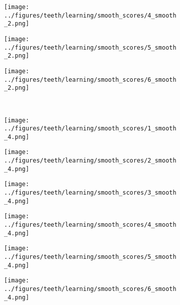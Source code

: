\begin{figure}[h!]
\begin{subfigure}{0.16\textwidth}
	\end{subfigure}
	\begin{subfigure}{0.16\textwidth}
		\centering
		\texttt{[image: ../figures/teeth/learning/smooth\_scores/4\_smooth\_2.png]}
		\label{fig:1}
	\end{subfigure}
	\begin{subfigure}{0.16\textwidth}
		\centering
		\texttt{[image: ../figures/teeth/learning/smooth\_scores/5\_smooth\_2.png]}
		\label{fig:1}
	\end{subfigure}
	\begin{subfigure}{0.16\textwidth}
		\centering
		\texttt{[image: ../figures/teeth/learning/smooth\_scores/6\_smooth\_2.png]}
		\label{fig:1}
	\end{subfigure}
	\vspace{-0.35cm}
	\\
	\begin{subfigure}{0.16\textwidth}
		\centering
		\texttt{[image: ../figures/teeth/learning/smooth\_scores/1\_smooth\_4.png]}
		\label{fig:1}
	\end{subfigure}
	\begin{subfigure}{0.16\textwidth}
		\centering
		\texttt{[image: ../figures/teeth/learning/smooth\_scores/2\_smooth\_4.png]}
		\label{fig:1}
	\end{subfigure}
	\begin{subfigure}{0.16\textwidth}
		\centering
		\texttt{[image: ../figures/teeth/learning/smooth\_scores/3\_smooth\_4.png]}
		\label{fig:1}
	\end{subfigure}
	\begin{subfigure}{0.16\textwidth}
		\centering
		\texttt{[image: ../figures/teeth/learning/smooth\_scores/4\_smooth\_4.png]}
		\label{fig:1}
	\end{subfigure}
	\begin{subfigure}{0.16\textwidth}
		\centering
		\texttt{[image: ../figures/teeth/learning/smooth\_scores/5\_smooth\_4.png]}
		\label{fig:1}
	\end{subfigure}
	\begin{subfigure}{0.16\textwidth}
		\centering
		\texttt{[image: ../figures/teeth/learning/smooth\_scores/6\_smooth\_4.png]}
		\label{fig:1}
	\end{subfigure}

\end{figure}

